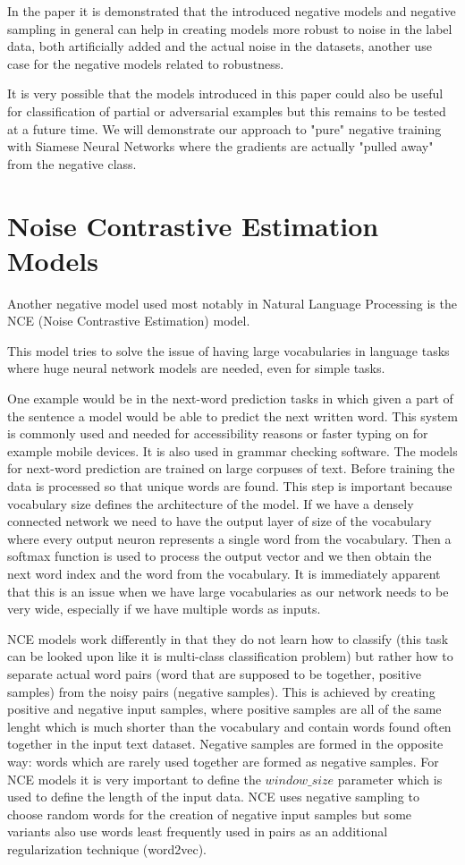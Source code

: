 \documentclass[b5paper]{book}
\begin{document}
In the paper it is demonstrated that the introduced negative models and negative sampling in general can help in creating models more robust to noise in the label data, both artificially added and the actual noise in the datasets, another use case for the negative models related to robustness.

It is very possible that the models introduced in this paper could also be useful for classification of partial or adversarial examples but this remains to be tested at a future time. We will demonstrate our approach to "pure" negative training with Siamese Neural Networks where the gradients are actually "pulled away" from the negative class.

\section{Noise Contrastive Estimation Models}

Another negative model used most notably in Natural Language Processing is the NCE (Noise Contrastive Estimation) model.

This model tries to solve the issue of having large vocabularies in language tasks where huge neural network models are needed, even for simple tasks. 

One example would be in the next-word prediction tasks in which given a part of the sentence a model would be able to predict the next written word. This system is commonly used and needed for accessibility reasons or faster typing on for example mobile devices. It is also used in grammar checking software. The models for next-word prediction are trained on large corpuses of text. Before training the data is processed so that unique words are found. This step is important because vocabulary size defines the architecture of the model. If we have a densely connected network we need to have the output layer of size of the vocabulary where every output neuron represents a single word from the vocabulary. Then a softmax function is used to process the output vector and we then obtain the next word index and the word from the vocabulary. It is immediately apparent that this is an issue when we have large vocabularies as our network needs to be very wide, especially if we have multiple words as inputs. 

NCE models work differently in that they do not learn how to classify (this task can be looked upon like it is multi-class classification problem) but rather how to separate actual word pairs (word that are supposed to be together, positive samples) from the noisy pairs (negative samples). This is achieved by creating positive and negative input samples, where positive samples are all of the same lenght which is much shorter than the vocabulary and contain words found often together in the input text dataset. Negative samples are formed in the opposite way: words which are rarely used together are formed as negative samples. For NCE models it is very important to define the \(window\_size\) parameter which is used to define the length of the input data. NCE uses negative sampling to choose random words for the creation of negative input samples but some variants also use words least frequently used in pairs as an additional regularization technique (word2vec).
\end{document}
